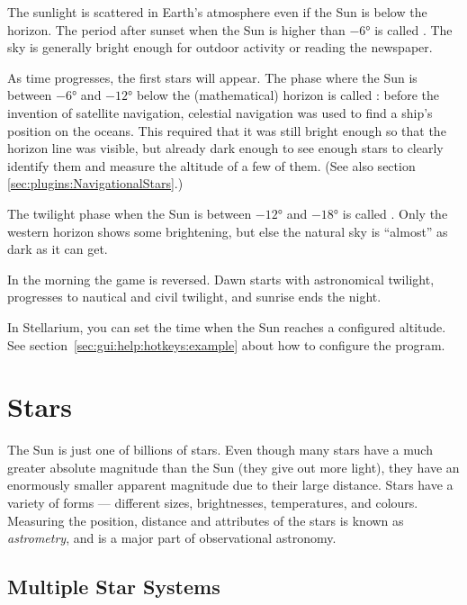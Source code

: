 The sunlight is scattered in Earth's atmosphere even if the Sun is
below the horizon. The period after sunset when the Sun is higher than
$-6°$ is called . The sky
is generally bright enough for outdoor activity or reading the
newspaper.

As time progresses, the first stars will appear. The phase where the
Sun is between $-6°$ and $-12°$ below the (mathematical) horizon is
called : before the
invention of satellite navigation, celestial navigation was used to
find a ship's position on the oceans. This required that it was still
bright enough so that the horizon line was visible, but already dark
enough to see enough stars to clearly identify them and measure the
altitude of a few of them. (See also section \ref{sec:plugins:NavigationalStars}.)

The twilight phase when the Sun is between $-12°$ and $-18°$ is called
. Only the
western horizon shows some brightening, but else the natural sky is
``almost'' as dark as it can get.

In the morning the game is reversed. Dawn starts with astronomical
twilight, progresses to nautical and civil twilight, and sunrise
ends the night.

In Stellarium, you can  set the time when the Sun
reaches a configured altitude. See
section~\ref{sec:gui:help:hotkeys:example} about how to configure the
program.


\section{Stars}
\label{sec:Phenomena:stars}

The Sun is just one of billions of stars. Even though many stars have a
much greater absolute magnitude than the Sun (they give out more light),
they have an enormously smaller apparent magnitude due to their large
distance. Stars have a variety of forms --- different sizes,
brightnesses, temperatures, and colours. Measuring the position,
distance and attributes of the stars is known as \emph{astrometry}, and
is a major part of observational astronomy.

\subsection{Multiple Star Systems}
\label{sec:Phenomena:multipleStars}

